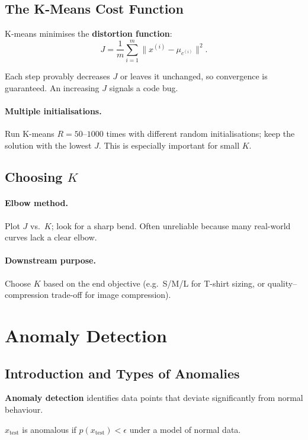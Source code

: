 \subsection{The K-Means Cost Function}

K-means minimises the \textbf{distortion function}:
\[J=\frac{1}{m}\sum_{i=1}^m\|x^{(i)}-\mu_{c^{(i)}}\|^2.\]

Each step provably decreases $J$ or leaves it unchanged, so convergence is
guaranteed. An increasing $J$ signals a code bug.

\paragraph{Multiple initialisations.} Run K-means $R=50$--$1000$ times with
different random initialisations; keep the solution with the lowest $J$.
This is especially important for small $K$.

\subsection{Choosing $K$}

\paragraph{Elbow method.} Plot $J$ vs.\ $K$; look for a sharp bend. Often
unreliable because many real-world curves lack a clear elbow.

\paragraph{Downstream purpose.} Choose $K$ based on the end objective
(e.g.\ S/M/L for T-shirt sizing, or quality--compression trade-off for image
compression).

\section{Anomaly Detection}

\subsection{Introduction and Types of Anomalies}

\textbf{Anomaly detection} identifies data points that deviate significantly
from normal behaviour.

\begin{definition}[Anomaly]
$x_{\text{test}}$ is anomalous if $p(x_{\text{test}})<\epsilon$
under a model of normal data.
\end{definition}

